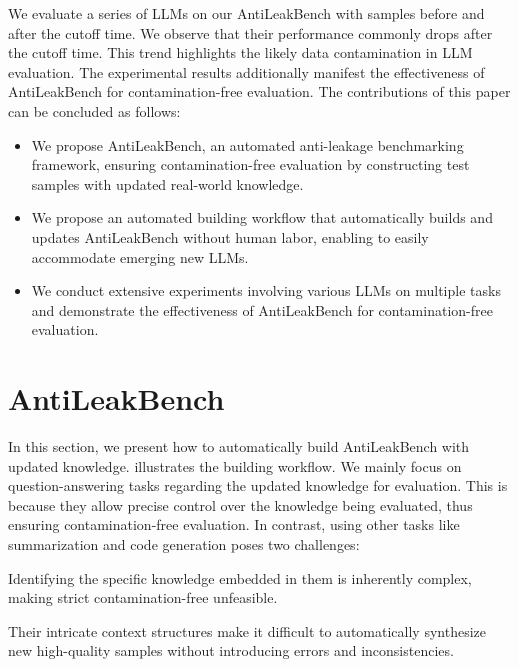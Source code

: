 \documentclass[11pt]{article}
\newcommand{\benchname}{{AntiLeakBench}\xspace}
\begin{document}
    We evaluate a series of LLMs on our \benchname with samples before and after the cutoff time.
    We observe that their performance commonly drops after the cutoff time.
    This trend highlights the likely data contamination in LLM evaluation.
    The experimental results additionally manifest the effectiveness of \benchname for contamination-free evaluation.
    The contributions of this paper can be concluded as follows:
    \begin{itemize}[leftmargin=*, itemsep=0pt]
        \item
            We propose \benchname, an automated anti-leakage benchmarking framework,
            ensuring contamination-free evaluation by constructing test samples with updated real-world knowledge.
        \item
            We propose an automated building workflow that automatically builds and updates \benchname without human labor,
            enabling to easily accommodate emerging new LLMs.
        \item
            We conduct extensive experiments involving various LLMs on multiple tasks
            and demonstrate the effectiveness of \benchname for contamination-free evaluation.
    \end{itemize}






\section{\benchname}
    In this section, we present how to automatically build \benchname with updated knowledge.
     illustrates the building workflow.
    We mainly focus on question-answering tasks regarding the updated knowledge for evaluation.
    This is because they allow precise control over the knowledge being evaluated, thus ensuring contamination-free evaluation.
    In contrast, using other tasks like summarization and code generation poses two challenges:
    \begin{inparaenum}
        \item
            Identifying the specific knowledge embedded in them is inherently complex, making strict contamination-free unfeasible.
        \item
            Their intricate context structures make it difficult to automatically synthesize new high-quality samples without introducing errors and inconsistencies.
    \end{inparaenum}
\end{document}
